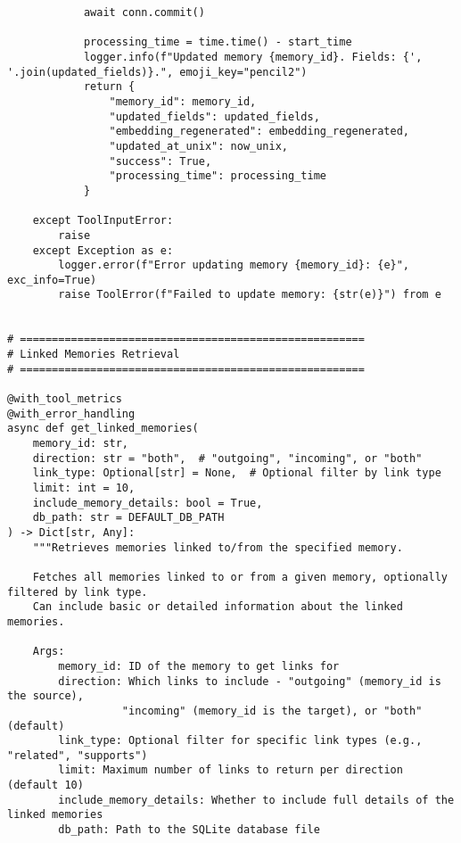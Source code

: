 \documentclass[12pt,a4paper]{article}
\begin{document}
\begin{pageablecode}
\begin{verbatim}
            await conn.commit()

            processing_time = time.time() - start_time
            logger.info(f"Updated memory {memory_id}. Fields: {', '.join(updated_fields)}.", emoji_key="pencil2")
            return {
                "memory_id": memory_id,
                "updated_fields": updated_fields,
                "embedding_regenerated": embedding_regenerated,
                "updated_at_unix": now_unix,
                "success": True,
                "processing_time": processing_time
            }

    except ToolInputError:
        raise
    except Exception as e:
        logger.error(f"Error updating memory {memory_id}: {e}", exc_info=True)
        raise ToolError(f"Failed to update memory: {str(e)}") from e


# ======================================================
# Linked Memories Retrieval
# ======================================================

@with_tool_metrics
@with_error_handling
async def get_linked_memories(
    memory_id: str,
    direction: str = "both",  # "outgoing", "incoming", or "both"
    link_type: Optional[str] = None,  # Optional filter by link type
    limit: int = 10,
    include_memory_details: bool = True,
    db_path: str = DEFAULT_DB_PATH
) -> Dict[str, Any]:
    """Retrieves memories linked to/from the specified memory.
    
    Fetches all memories linked to or from a given memory, optionally filtered by link type.
    Can include basic or detailed information about the linked memories.
    
    Args:
        memory_id: ID of the memory to get links for
        direction: Which links to include - "outgoing" (memory_id is the source),
                  "incoming" (memory_id is the target), or "both" (default)
        link_type: Optional filter for specific link types (e.g., "related", "supports")
        limit: Maximum number of links to return per direction (default 10)
        include_memory_details: Whether to include full details of the linked memories
        db_path: Path to the SQLite database file
        

\end{verbatim}
\end{pageablecode}
\end{document}

